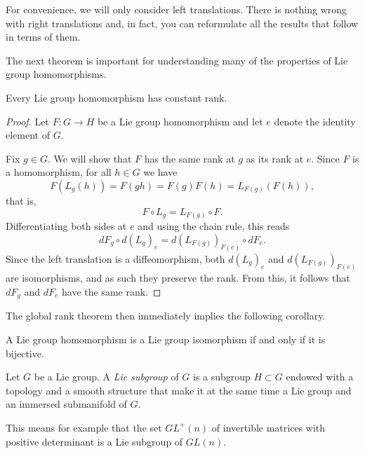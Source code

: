 \begin{remark}
	For convenience, we will only consider left translations.
	There is nothing wrong with right translations and, in fact, you can reformulate all the results that follow in terms of them.
\end{remark}

The next theorem is important for understanding many of the properties of Lie group homomorphisms.

\begin{theorem}
	Every Lie group homomorphism has constant rank.
\end{theorem}
\begin{proof}
	Let $F:G\to H$ be a Lie group homomorphism and let $e$ denote the identity element of $G$.

	Fix $g\in G$.
	We will show that $F$ has the same rank at $g$ as its rank at $e$.
	Since $F$ is a homomorphism, for all $h\in G$ we have
	\begin{equation}
		F(L_g(h)) = F(gh) = F(g)F(h) = L_{F(g)}(F(h)),
	\end{equation}
	that is,
	\begin{equation}
		F\circ L_g = L_{F(g)}\circ F.
	\end{equation}
	Differentiating both sides at $e$ and using the chain rule, this reads
	\begin{equation}
		dF_g\circ d(L_g)_e = d(L_{F(g)})_{F(e)}\circ dF_e.
	\end{equation}
	Since the left translation is a diffeomorphism, both $d(L_g)_e$ and $d(L_{F(g)})_{F(e)}$ are isomorphisms, and as such they preserve the rank.
	From this, it follows that $dF_g$ and $dF_e$ have the same rank.
\end{proof}

The global rank theorem then immediately implies the following corollary.
\begin{corollary}
	A Lie group homomorphism is a Lie group isomorphism if and only if it is bijective.
\end{corollary}

\begin{definition}
	Let $G$ be a Lie group. A \emph{Lie subgroup} of $G$ is a subgroup $H\subset G$ endowed with a topology and a smooth structure that make it at the same time a Lie group and an immersed submanifold of $G$.
\end{definition}

\begin{example}
	This means for example that the set $GL^+(n)$ of invertible matrices with positive determinant is a Lie subgroup of $GL(n)$.
\end{example}

